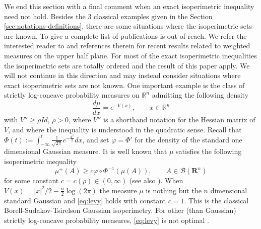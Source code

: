 \documentclass[11pt]{article}
\newcommand{\1}{[1]}
\begin{document}
\medskip

We end this section with a final comment when an exact isoperimetric inequality need not hold. 
Besides the 3 classical examples given in the Section \ref{sec:notations-definitions}, there are some situations where the isoperimetric sets are known. To give a complete list of publications is out of reach. We refer the interested reader to \cite{ABFC} and references therein for recent results related to weighted measures on the upper half plane. For most of the exact isoperimetric inequalities the isoperimetric sets are totally ordered and the result of this paper apply. We will not continue in this direction and may instead consider situations where exact isoperimetric sets are not known. 
One important example is the class of strictly log-concave probability measures on $\mathbb{R}^{n}$
admitting the following density 
$$
\frac{d\mu}{dx}=e^{-V(x)}, 
\qquad x \in \mathbb{R}^n
$$ 
with $V''\geq \rho Id$, $\rho >0$, where $V''$ is a shorthand notation for the Hessian matrix of $V$, and where the inequality is understood in the quadratic sense.
Recall that 
$\Phi(t):=\int_{-\infty}^{t}\frac{1}{\sqrt{2\pi}}e^{-\frac{x^{2}}{2}}dx$, and set $\varphi=\Phi'$ for the density of the standard one dimensional Gaussian measure.
It is  well known that $\mu$ satisfies the following isoperimetric inequality 
\begin{equation} \label{eq:levy}
    \mu^+(A)
    \geq 
    c
    \varphi\circ\Phi^{-1}(\mu(A)), \qquad A\in\mathcal{B}(\mathbf{R}^{n})
\end{equation} 
for some constant $c=c(\rho) \in (0,\infty)$
\cite{bakry-ledoux} (see also \cite{milman2010,ivanisvili-volberg,duggal2024curvature}).
When $V(x)=|x|^2/2-\frac{n}{2}\log(2\pi)$ the measure
$\mu$ is nothing but the $n$ dimensional standard Gaussian and \eqref{eq:levy} holds with constant $c=1$.
This is the classical Borell-Sudakov-Tsirelson Gaussian isoperimetry. 
For other  (than Gaussian) strictly log-concave probability measures, 
\eqref{eq:levy} is not optimal \cite{bobkov-houdre}.
\end{document}

